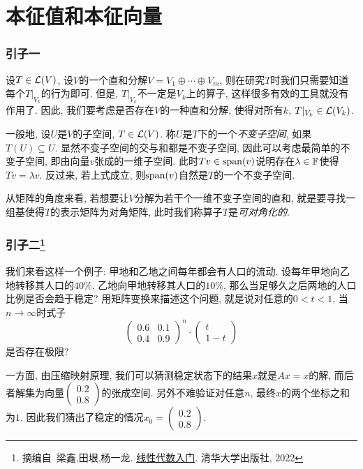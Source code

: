 \chapter{本征值和本征向量}

\subsection*{引子一}

设$T \in \mathcal{L} (V)$, 设$V$的一个直和分解$V=V_1 \oplus \cdots \oplus V_m$, 则在研究$T$时我们只需要知道每个$T|_{V_k}$的行为即可. 但是, $T|_{V_k}$不一定是$V_k$上的算子, 这样很多有效的工具就没有作用了. 因此, 我们要考虑是否存在$V$的一种直和分解, 使得对所有$k$, $T|_{V_k} \in \mathcal{L} (V_k)$. 

一般地, 设$U$是$V$的子空间, $T\in \mathcal{L} (V)$. 称$U$是$T$下的一个\textit{不变子空间}, 如果$T(U) \subseteq U$. 显然不变子空间的交与和都是不变子空间, 因此可以考虑最简单的不变子空间, 即由向量$v$张成的一维子空间. 此时$Tv \in \operatorname{span} (v)$说明存在$\lambda \in \mathbb{F}$使得$Tv=\lambda v$. 反过来, 若上式成立, 则$\operatorname{span} (v)$自然是$T$的一个不变子空间. 

从矩阵的角度来看, 若想要让$V$分解为若干个一维不变子空间的直和, 就是要寻找一组基使得$T$的表示矩阵为对角矩阵, 此时我们称算子$T$是\textit{可对角化的}. 

\subsection*{引子二\footnote{摘编自~梁鑫,田垠,杨一龙. \underline{线性代数入门}. 清华大学出版社, 2022}}

我们来看这样一个例子: 甲地和乙地之间每年都会有人口的流动. 设每年甲地向乙地转移其人口的$40 \%$, 乙地向甲地转移其人口的$10 \%$, 那么当足够久之后两地的人口比例是否会趋于稳定? 用矩阵变换来描述这个问题, 就是说对任意的$0<t<1$, 当$n\to \infty$时式子$$
\begin{pmatrix}
 0.6 & 0.1\\
 0.4 & 0.9
\end{pmatrix}^n \cdot \begin{pmatrix}
t \\
1-t
\end{pmatrix}$$
是否存在极限? 

一方面, 由压缩映射原理, 我们可以猜测稳定状态下的结果$x$就是$Ax=x$的解, 而后者解集为向量$\begin{pmatrix}
0.2 \\ 0.8
\end{pmatrix}$的张成空间. 另外不难验证对任意$n$, 最终$x$的两个坐标之和为$1$. 因此我们猜出了稳定的情况$x_0=\begin{pmatrix}
0.2 \\ 0.8
\end{pmatrix}$. 

